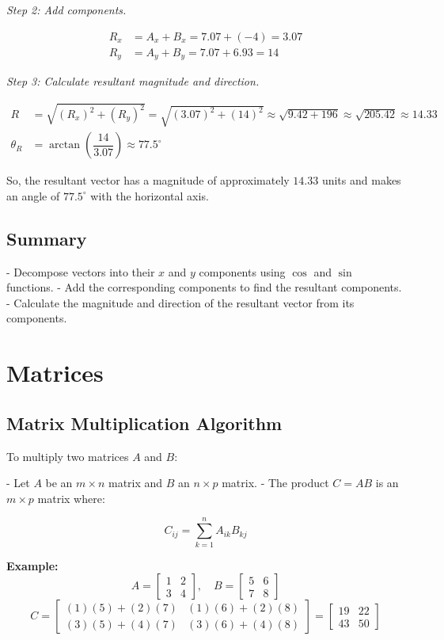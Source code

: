 \documentclass{article}
\begin{document}
\begin{multicols}{2}
\textit{Step 2: Add components.}

\[
\begin{aligned}
R_x &= A_x + B_x = 7.07 + (-4) = 3.07 \\
R_y &= A_y + B_y = 7.07 + 6.93 = 14
\end{aligned}
\]

\textit{Step 3: Calculate resultant magnitude and direction.}

\[
\begin{aligned}
R &= \sqrt{(R_x)^2 + (R_y)^2} = \sqrt{(3.07)^2 + (14)^2} \approx \sqrt{9.42 + 196} \approx \sqrt{205.42} \approx 14.33 \\
\theta_R &= \arctan\left( \dfrac{14}{3.07} \right) \approx 77.5^\circ
\end{aligned}
\]

So, the resultant vector has a magnitude of approximately \( 14.33 \) units and makes an angle of \( 77.5^\circ \) with the horizontal axis.

\subsection*{Summary}

- Decompose vectors into their \( x \) and \( y \) components using \( \cos \) and \( \sin \) functions.
- Add the corresponding components to find the resultant components.
- Calculate the magnitude and direction of the resultant vector from its components.


\section*{Matrices}

\subsection*{Matrix Multiplication Algorithm}
To multiply two matrices \( A \) and \( B \):

- Let \( A \) be an \( m \times n \) matrix and \( B \) an \( n \times p \) matrix.
- The product \( C = AB \) is an \( m \times p \) matrix where:

\[
C_{ij} = \sum_{k=1}^n A_{ik} B_{kj}
\]

\textbf{Example:}
\[
A = \begin{bmatrix} 1 & 2 \\ 3 & 4 \end{bmatrix}, \quad B = \begin{bmatrix} 5 & 6 \\ 7 & 8 \end{bmatrix}
\]
\[
C = \begin{bmatrix} (1)(5) + (2)(7) & (1)(6) + (2)(8) \\ (3)(5) + (4)(7) & (3)(6) + (4)(8) \end{bmatrix} = \begin{bmatrix} 19 & 22 \\ 43 & 50 \end{bmatrix}
\]


\end{multicols}
\end{document}
